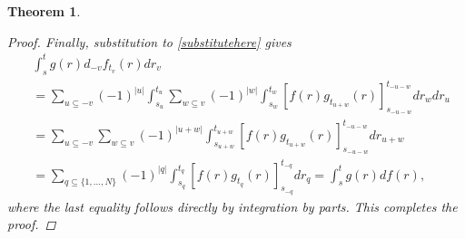 \documentclass[english, a4paper, 12pt,reqno]{amsart}
\newtheorem{theorem}[defi]{Theorem}
\begin{document}
\begin{theorem}
\begin{proof}
Finally, substitution to \eqref{substitutehere} gives
\begin{equation*}
\begin{split}
&\int_s^t g(r) d_{-v} f_{t_v}(r) dr_v\\ &= \sum_{u\subseteq -v} (-1)^{|u|} \int_{s_u}^{t_u} \sum_{w\subseteq v} (-1)^{|w|} \int_{s_w}^{t_w} \left[f(r) g_{t_{u+w}}(r)\right]_{s_{-u-w}}^{t_{-u-w}} dr_w dr_u\\
&= \sum_{u\subseteq -v}\sum_{w\subseteq v}(-1)^{|u+w|} \int_{s_{u+w}}^{t_{u+w}}\left[f(r) g_{t_{u+w}}(r)\right]_{s_{-u-w}}^{t_{-u-w}} dr_{u+w}\\
&= \sum_{q\subseteq \{1,\dots,N\}}(-1)^{|q|} \int_{s_{q}}^{t_{q}}\left[f(r) g_{t_{q}}(r)\right]_{s_{-q}}^{t_{-q}} dr_{q} = \int_s^t g(r) df(r),
\end{split}
\end{equation*}
where the last equality follows directly by integration by parts. This completes the proof.
\end{proof}
\end{theorem}
\end{document}

